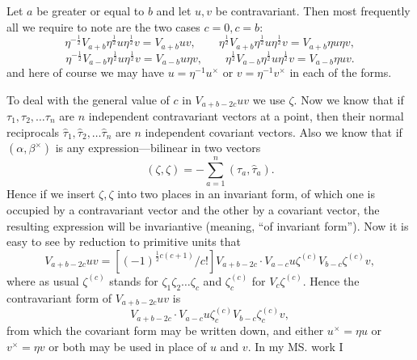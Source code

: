 \documentclass[11pt]{article}
\begin{document}
\indent Let $a$ be greater or equal to $b$ and let $u,v$ be contravariant. Then most frequently all we require to note are the two cases $c=0,c=b$:
\[
\eta^{-\frac12}V_{a+b}\eta^{\frac12}u\eta^{\frac12}v=V_{a+b}uv,\qquad \eta^{\frac12}V_{a+b}\eta^{\frac12}u\eta^{\frac12}v=V_{a+b}\eta u\eta v,
\]
\[
\eta^{-\frac12}V_{a-b}\eta^{\frac12}u\eta^{\frac12}v=V_{a-b}u\eta v,\qquad \eta^{\frac12}V_{a-b}\eta^{\frac12}u\eta^{\frac12}v=V_{a-b}\eta u v.
\]
and here of course we may have $u=\eta^{-1}u^\times$ or $v=\eta^{-1}v^\times$ in each of the forms.

\indent To deal with the general value of $c$ in $V_{a+b-2c}uv$ we use $\zeta$. Now we know that if $\tau_1,\tau_2,\ldots\tau_n$ are $n$ independent contravariant vectors at a point, then their normal reciprocals $\hat{\tau}_1,\hat{\tau}_2,\ldots\hat{\tau}_n$ are $n$ independent covariant vectors. Also we know that if $(\alpha,\beta^\times)$ is any expression---bilinear in two vectors
\[
(\zeta,\zeta)=-\sum_{a=1}^n(\tau_a,\hat{\tau}_a).
\]
Hence if we insert $\zeta,\zeta$ into two places in an invariant form, of which one is occupied by a contravariant vector and the other by a covariant vector, the resulting expression will be invariantive (meaning, ``of invariant form''). Now it is easy to see by reduction to primitive units that
\begin{equation}V_{a+b-2c}uv=[(-1)^{\frac12c(c+1)}/c!]V_{a+b-2c}\cdot V_{a-c}u\zeta^{(c)}V_{b-c}\zeta^{(c)}v,\tag{1}\end{equation}
where as usual $\zeta^{(c)}$ stands for $\zeta_1\zeta_2\ldots\zeta_c$ and $\zeta_c^{(c)}$ for $V_c\zeta^{(c)}$. Hence the contravariant form of $V_{a+b-2c}uv$ is
\begin{equation}[(-1)^{\frac12c(c+1)}/c!]V_{a+b-2c}\cdot V_{a-c}u\zeta_c^{(c)}V_{b-c}\zeta_c^{(c)}v,\tag{2}\end{equation}
from which the covariant form may be written down, and either $u^\times=\eta u$ or $v^\times=\eta v$ or both may be used in place of $u$ and $v$. In my MS. work I
\end{document}
